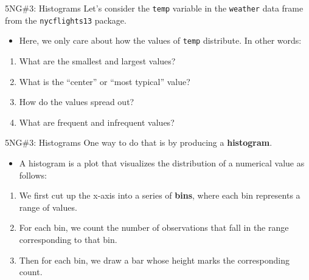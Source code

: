 \documentclass[
  ignorenonframetext,
]{beamer}
\providecommand{\tightlist}{%
  \setlength{\itemsep}{0pt}\setlength{\parskip}{0pt}}
\begin{document}
\begin{frame}[fragile]{5NG\#3: Histograms}
\protect\hypertarget{ng3-histograms}{}
Let's consider the \texttt{temp} variable in the \texttt{weather} data
frame from the \texttt{nycflights13} package.

\begin{itemize}
\tightlist
\item
  Here, we only care about how the values of \texttt{temp} distribute.
  In other words:
\end{itemize}

\begin{enumerate}
\tightlist
\item
  What are the smallest and largest values?
\item
  What is the ``center'' or ``most typical'' value?
\item
  How do the values spread out?
\item
  What are frequent and infrequent values?
\end{enumerate}
\end{frame}

\begin{frame}{5NG\#3: Histograms}
\protect\hypertarget{ng3-histograms-1}{}
One way to do that is by producing a \textbf{histogram}.

\begin{itemize}
\tightlist
\item
  A histogram is a plot that visualizes the distribution of a numerical
  value as follows:
\end{itemize}

\begin{enumerate}
\item
  We first cut up the x-axis into a series of \textbf{bins}, where each
  bin represents a range of values.
\item
  For each bin, we count the number of observations that fall in the
  range corresponding to that bin.
\item
  Then for each bin, we draw a bar whose height marks the corresponding
  count.
\end{enumerate}
\end{frame}
\end{document}
